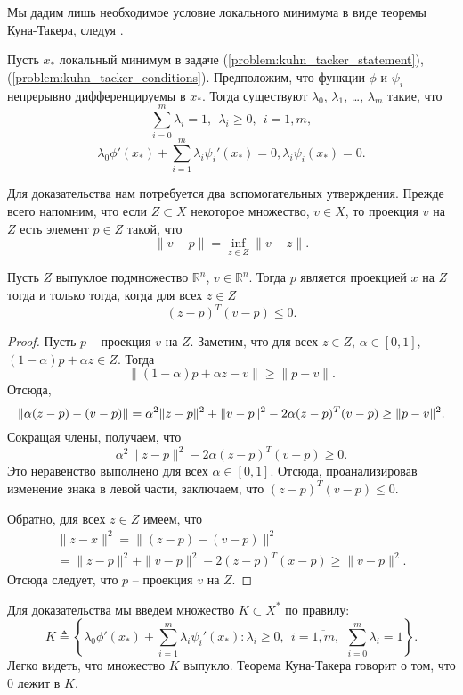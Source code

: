 \documentclass[a4paper,12pt]{report}
\begin{document}
 Мы дадим лишь необходимое условие локального минимума в виде теоремы Куна-Такера, следуя \cite{Kuhn_Tacker}.

\begin{theorem}\label{th:Kuhn_Tacker}
	Пусть $x_*$ локальный минимум в задаче (\ref{problem:kuhn_tacker_statement}), (\ref{problem:kuhn_tacker_conditions}). Предположим, что  функции $\phi$ и $\psi_i$ непрерывно дифференцируемы в $x_*$. Тогда существуют  $\lambda_0$, $\lambda_1$, \ldots, $\lambda_m$ такие, что
	$$\sum_{i=0}^{m}\lambda_i=1,\ \ \lambda_i\geq 0,\ \ i=\overline{1,m}, $$
	$$\lambda_0 \phi'(x_*)+\sum_{i=1}^{m}\lambda_i \psi_i'(x_*)=0,
	\lambda_i \psi_i(x_*)=0. $$
\end{theorem}

Для доказательства нам потребуется два вспомогательных утверждения. Прежде всего напомним, что если $Z\subset X$ некоторое множество, $v\in X$, то проекция $v$ на $Z$ есть элемент $p\in Z$ такой, что
$$\|v-p\|=\inf_{z\in Z}\|v-z\|. $$
\begin{lemma}\label{lm:convex}
	Пусть $Z$ выпуклое подмножество $\mathbb{R}^n$, $v\in\mathbb{R}^n$. Тогда $p$ является проекцией $x$ на $Z$ тогда и только тогда, когда для всех $z\in Z$
	$$(z-p)^T(v-p)\leq 0. $$
\end{lemma}
\begin{proof}
	Пусть $p$ -- проекция $v$ на $Z$. Заметим, что для всех $z\in Z$, $\alpha\in [0,1]$, $(1-\alpha)p+\alpha z \in Z$. Тогда
	\begin{equation*}
	\|(1-\alpha) p+\alpha z-v\|\geq \|p-v\|.
	\end{equation*} Отсюда,
	\begin{equation*}\|\alpha (z-p)-(v-p)\|=\alpha^2\|z-p\|^2+\|v-p\|^2-2\alpha (z-p)^T(v-p) \\ \geq \|p-v\|^2.\end{equation*} Сокращая члены, получаем, что
	$$\alpha^2\|z-p\|^2-2\alpha (z-p)^T(v-p)\geq 0. $$ Это неравенство выполнено для всех $\alpha\in [0,1]$. Отсюда, проанализировав изменение знака в левой части, заключаем, что $(z-p)^T(v-p)\leq 0$. 
	
	Обратно, для всех $z\in Z$ имеем, что
	\begin{multline*}
	\|z-x\|^2=\|(z-p)-(v-p)\|^2\\=\|z-p\|^2+\|v-p\|^2-2(z-p)^T(x-p)\geq \|v-p\|^2.
	\end{multline*}	 Отсюда следует, что $p$ -- проекция $v$ на $Z$.
\end{proof}

Для доказательства мы введем множество $K\subset X^*$ по правилу:
$$K\triangleq \left\{\lambda_0\phi'(x_*)+\sum_{i=1}^m\lambda_i\psi_i'(x_*):\lambda_i\geq 0,\ \ i=\overline{1,m},\ \ \sum_{i=0}^m\lambda_i=1\right\}. $$ Легко видеть, что множество $K$  выпукло. Теорема Куна-Такера говорит о том, что $0$ лежит в $K$.
\end{document}
